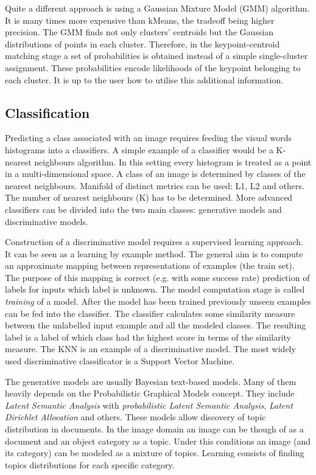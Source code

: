 	Quite a different approach is using a Gaussian Mixture Model (GMM) algorithm. It is many times more expensive than kMeans, the tradeoff being higher precision. The GMM finds not only clusters' centroids but the Gaussian distributions of points in each cluster. Therefore, in the keypoint-centroid matching stage a set of probabilities is obtained instead of a simple single-cluster assignment. These probabilities encode likelihoods of the keypoint belonging to each cluster. It is up to the user how to utilise this additional information.

\subsection{Classification}

	Predicting a class associated with an image requires feeding the visual words histograms into a classifiers. A simple example of a classifier would be a K-nearest neighbours algorithm. In this setting every histogram is treated as a point in a multi-dimensional space. A class of an image is determined by classes of the nearest neighbours. Manifold of distinct metrics can be used: L1, L2  and others. The number of nearest neighbours (K) has to be determined. More advanced classifiers can be divided into the two main classes: generative models and discriminative models.
	
	Construction of a discriminative model requires a supervised learning approach. It can be seen as a learning by example method. The general aim is to compute an approximate mapping between representations of examples (the train set). The purpose of this mapping is correct (e.g. with some success rate) prediction of labels for inputs which label is unknown. The model computation stage is called \emph{training} of a model. After the model has been trained previously unseen examples can be fed into the classifier. The classifier calculates some similarity measure between the unlabelled input example and all the modeled classes. The resulting label is a label of which class had the highest score in terms of the similarity measure. The KNN is an example of a discriminative model. The most widely used discriminative classificator is a Support Vector Machine.
	
	The generative models are usually Bayesian text-based models. Many of them heavily depends on the Probabilistic Graphical Models concept. They include \emph{Latent Semantic Analysis} with \emph{probabilistic Latent Semantic Analysis}, \emph{Latent Dirichlet Allocation} and others. These models allow discovery of topic distribution in documents. In the image domain an image can be though of as a document and an object category as a topic. Under this conditions an image (and its category) can be modeled as a mixture of topics. Learning consists of finding topics distributions for each specific category. 
